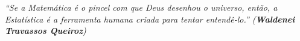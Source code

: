 
\begin{epigrafe}
\vspace{3cm}


\begin{minipage}{10cm}

\textit{``Se a Matemática é o pincel com que Deus desenhou o universo, então, a Estatística é a ferramenta humana criada para tentar entendê-lo.'' (\textbf{Waldenei Travassos Queiroz})}

\end{minipage}



\end{epigrafe}




